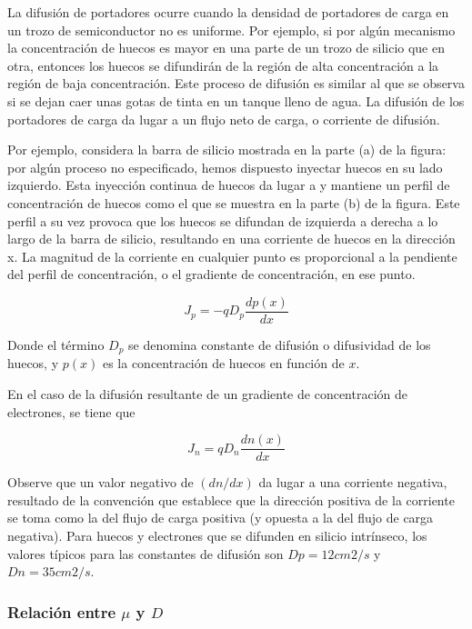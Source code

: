 La difusión de portadores ocurre cuando la densidad de portadores de carga en un trozo de semiconductor no es uniforme. Por ejemplo, si por algún mecanismo la concentración de huecos es mayor en una parte de un trozo de silicio que en otra, entonces los huecos se difundirán de la región de alta concentración a la región de baja concentración. Este proceso de difusión es similar al que se observa si se dejan caer unas gotas de tinta en un tanque lleno de agua. La difusión de los portadores de carga da lugar a un flujo neto de carga, o corriente de difusión.

Por ejemplo, considera la barra de silicio mostrada en la parte (a) de la figura: por algún proceso no especificado, hemos dispuesto inyectar huecos en su lado izquierdo. Esta inyección continua de huecos da lugar a y mantiene un perfil de concentración de huecos como el que se muestra en la parte (b) de la figura. Este perfil a su vez provoca que los huecos se difundan de izquierda a derecha a lo largo de la barra de silicio, resultando en una corriente de huecos en la dirección x. La magnitud de la corriente en cualquier punto es proporcional a la pendiente del perfil de concentración, o el gradiente de concentración, en ese punto.

\begin{equation*}
J_p = -q D_p \frac{d p(x)}{dx}
\end{equation*}

Donde el término $D_p$ se denomina constante de difusión o difusividad de los huecos, y $p(x)$ es la concentración de huecos en función de $x$.

En el caso de la difusión resultante de un gradiente de concentración de electrones, se tiene que

\begin{equation*}
J_n = q D_n \frac{d n(x)}{dx}
\end{equation*}

Observe que un valor negativo de $(dn/dx)$ da lugar a una corriente negativa, resultado de la convención que establece que la dirección positiva de la corriente se toma como la del flujo de carga positiva (y opuesta a la del flujo de carga negativa). Para huecos y electrones que se difunden en silicio intrínseco, los valores típicos para las constantes de difusión son $Dp = 12 cm2/s$ y $Dn = 35 cm2/s$.

\subsubsection*{Relación entre $\mu$ y $D$}

